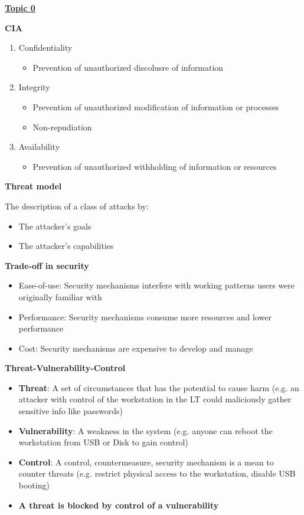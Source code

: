 \documentclass[landscape,a4paper]{extarticle}
\begin{document}
\fontsize{7}{8}\selectfont
{}\selectfont
\begin{multicols*}{5}
	\textbf{\uline{Topic 0}}

	\textbf{CIA}
	\begin{enumerate}
		\item Confidentiality
		      \begin{itemize}
			      \item Prevention of unauthorized discolusre of information
		      \end{itemize}
		\item Integrity
		      \begin{itemize}
			      \item Prevention of unauthorized modification of information or processes
			      \item Non-repudiation
		      \end{itemize}
		\item Availability
		      \begin{itemize}
			      \item Prevention of unauthorized withholding of information or resources
		      \end{itemize}
	\end{enumerate}
	\textbf{Threat model}

	The description of a class of attacks by:
	\begin{itemize}
		\item The attacker's goals
		\item The attacker's capabilities
	\end{itemize}

	\textbf{Trade-off in security}
	\begin{itemize}
		\item Ease-of-use: Security mechanisms interfere with working patterns
        users were originally familiar with
		\item Performance: Security mechanisms consume more resources and lower
        performance
		\item Cost: Security mechanisms are expensive to develop and manage
	\end{itemize}

	\textbf{Threat-Vulnerability-Control}
	\begin{itemize}
		\item \textbf{Threat}: A set of circumstances that has the potential to cause harm (e.g. an
        attacker with control of the workstation in the LT could maliciously gather
        sensitive info like passwords)
        \item \textbf{Vulnerability}: A weakness in the system (e.g. anyone can reboot the
        workstation from USB or Disk to gain control)
        \item \textbf{Control}: A control, countermeasure, security mechanism is a mean to counter threats
        (e.g. restrict physical access to the workstation, disable USB booting)
        \item \textbf{A threat is blocked by control of a vulnerability}
	\end{itemize}
    

\end{multicols*}
\end{document}
